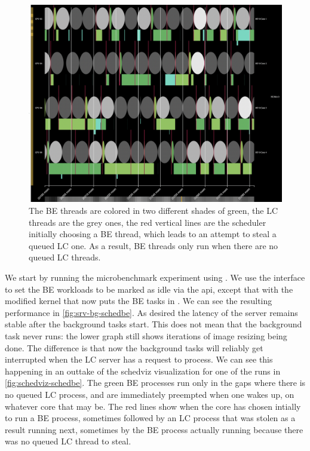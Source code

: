 \begin{figure}[t]
    \centering
    \includegraphics[width=\columnwidth]{graphs/schedviz-schedbe.png}
    \caption{The BE threads are colored in two different shades of green, the LC
    threads are the grey ones, the red vertical lines are the scheduler
    initially choosing a BE thread, which leads to an attempt to steal a queued
    LC one. As a result, BE threads only run when there are no queued LC
    threads.}\label{fig:schedviz-schedbe}
\end{figure}

We start by running the microbenchmark experiment using \schedbe{}. We use the
\cgroups{} interface to set the BE workloads to be marked as idle via the
\cgroups{} api, except that with the modified kernel that now puts the BE tasks
in \schedbe{}. We can see the resulting performance in
\autoref{fig:srv-bg-schedbe}. As desired the latency of the server remains
stable after the background tasks start. This does not mean that the background
task never runs: the lower graph still shows iterations of image resizing being
done. The difference is that now the background tasks will reliably get
interrupted when the LC server has a request to process. We can see this
happening in an outtake of the schedviz visualization for one of the runs in
\autoref{fig:schedviz-schedbe}. The green BE processes run only in the gaps
where there is no queued LC process, and are immediately preempted when one
wakes up, on whatever core that may be. The red lines show when the core has
chosen intially to run a BE process, sometimes followed by an LC process that
was stolen as a result running next, sometimes by the BE process actually
running because there was no queued LC thread to steal.

